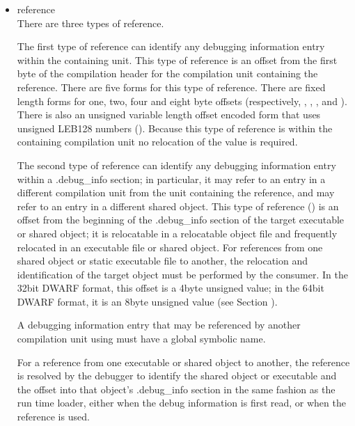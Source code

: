 \begin{itemize}
\item reference \\
There are three types of reference.

The first type of reference can identify any debugging
information entry within the containing unit. This type of
reference is an offset from the first byte of the compilation
header for the compilation unit containing the reference. There
are five forms for this type of reference. There are fixed
length forms for one, two, four and eight byte offsets
(respectively, , 
, 
,
and ). 
There is also an unsigned variable
length offset encoded form that uses unsigned LEB128 numbers
(). 
Because this type of reference is within
the containing compilation unit no relocation of the value
is required.

The second type of reference can identify any debugging
information entry within a .debug\_info section; in particular,
it may refer to an entry in a different compilation unit
from the unit containing the reference, and may refer to an
entry in a different shared object.  This type of reference
() is an offset from the beginning of the
.debug\_info section of the target executable or shared object;
it is relocatable in a relocatable object file and frequently
relocated in an executable file or shared object. For
references from one shared object or static executable file
to another, the relocation and identification of the target
object must be performed by the consumer. In the 32\dash bit DWARF
format, this offset is a 4\dash byte unsigned value; 
in the 64\dash bit DWARF format, it is an 8\dash byte
unsigned value 
(see Section ).

A debugging information entry that may be referenced by
another compilation unit using  must have a
global symbolic name.

For a reference from one executable or shared object to
another, the reference is resolved by the debugger to identify
the shared object or executable and the offset into that
object’s .debug\_info section in the same fashion as the run
time loader, either when the debug information is first read,
or when the reference is used.


\end{itemize}
